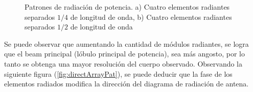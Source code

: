 \begin{figure}[H]
	\centering
	\caption{Patrones de radiación de potencia. a) Cuatro elementos radiantes separados $1/4$ de longitud de onda, b)
	Cuatro elementos radiantes separados $1/2$ de longitud de onda}
	\label{fig:fourArrayPat}
\end{figure}

Se puede observar que aumentando la cantidad de módulos radiantes, se logra que el beam principal (lóbulo principal de 
potencia), sea más angosto, por lo tanto se obtenga una mayor resolución del cuerpo observado. Observando la siguiente 
figura (\ref{fig:directArrayPat}), se puede deducir que la fase de los elementos radiados modifica la dirección del 
diagrama de radiación de antena.

